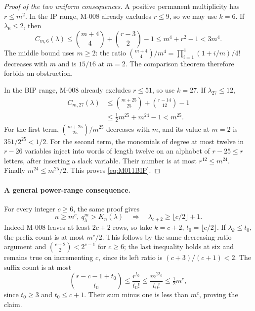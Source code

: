 \begin{proof}[Proof of the two uniform consequences]
A positive permanent multiplicity has \(r\leq m^2\).
In the IP range, M-008 already excludes \(r\leq9\), so
we may use \(k=6\). If \(\lambda_6\leq2\), then
\[
 C_{m,6}(\lambda)
 \leq\binom{m+4}{4}+\binom{r-3}{2}-1
 \leq m^4+r^2-1<3m^4.
\]
The middle bound uses \(m\geq2\): the ratio
\(\binom{m+4}{4}/m^4=\prod_{i=1}^4(1+i/m)/4!\)
decreases with \(m\) and is \(15/16\) at \(m=2\).
The comparison theorem therefore forbids an obstruction.

In the BIP range, M-008 already excludes \(r\leq51\),
so use \(k=27\). If \(\lambda_{27}\leq12\),
\[
 \begin{split}
 C_{m,27}(\lambda)
 &\leq\binom{m+25}{25}+\binom{r-14}{12}-1\\
 &\leq\tfrac12m^{25}+m^{24}-1<m^{25}.
 \end{split}
\]
For the first term,
\(\binom{m+25}{25}/m^{25}\) decreases with \(m\),
and its value at \(m=2\) is \(351/2^{25}<1/2\).
For the second term, the monomials of degree at most twelve
in \(r-26\) variables inject into words of length twelve
on an alphabet of \(r-25\leq r\) letters, after inserting
a slack variable. Their number is at most \(r^{12}\leq m^{24}\).
Finally \(m^{24}\leq m^{25}/2\). This proves
\eqref{eq:M011BIP}.
\end{proof}

\paragraph{A general power-range consequence.}
For every integer \(c\geq6\), the same proof gives
\[
 n\geq m^c,\ q^m_\lambda>K_n(\lambda)
 \quad\Longrightarrow\quad
       \lambda_{c+2}\geq\lfloor c/2\rfloor+1.          \tag{M-011.2}
\]
Indeed M-008 leaves at least \(2c+2\) rows, so take
\(k=c+2\), \(t_0=\lfloor c/2\rfloor\). If
\(\lambda_k\leq t_0\), the prefix count is at most
\(m^c/2\). This follows by the same decreasing-ratio
argument and \(\binom{c+2}{2}<2^{c-1}\) for \(c\geq6\);
the last inequality holds at six and remains true on
incrementing \(c\), since its left ratio is
\((c+3)/(c+1)<2\). The suffix count is at most
\[
 \binom{r-c-1+t_0}{t_0}
       \leq\frac{r^{t_0}}{t_0!}
       \leq\frac{m^{2t_0}}{t_0!}\leq\tfrac12m^c,
\]
since \(t_0\geq3\) and \(t_0\leq c+1\).
Their sum minus one is less than \(m^c\), proving the claim.

